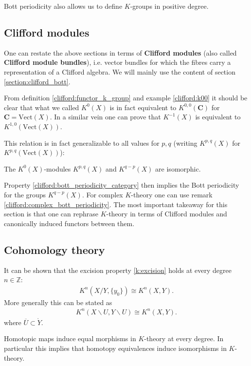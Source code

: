 {    \begin{remark}
        Bott periodicity also allows us to define $K$-groups in positive degree.
    \end{remark}

\subsection{Clifford modules}

    One can restate the above sections in terms of \textbf{Clifford modules} (also called \textbf{Clifford module bundles}), i.e. vector bundles for which the fibres carry a representation of a Clifford algebra. We will mainly use the content of section \ref{section:clifford_bott}.

    From definition \ref{clifford:functor_k_group} and example \ref{clifford:k00} it should be clear that what we called $K^0(X)$ is in fact equivalent to $K^{0,0}(\mathbf{C})$ for $\mathbf{C}=\text{Vect}(X)$. In a similar vein one can prove that $K^{-1}(X)$ is equivalent to $K^{1, 0}(\text{Vect}(X))$.

    This relation is in fact generalizable to all values for $p,q$ (writing $K^{p,q}(X)$ for $K^{p,q}(\text{Vect}(X))$):
    \begin{property}
        The $K^0(X)$-modules $K^{p,q}(X)$ and $K^{q-p}(X)$ are isomorphic.
    \end{property}

    Property \ref{clifford:bott_periodicity_category} then implies the Bott periodicity for the groups $K^{q-p}(X)$. For complex $K$-theory one can use remark \ref{clifford:complex_bott_periodicity}. The most important takeaway for this section is that one can rephrase $K$-theory in terms of Clifford modules and canonically induced functors between them.

\subsection{Cohomology theory}

    \begin{property}[Excision]
        It can be shown that the excision property \ref{k:excision} holds at every degree $n\in\mathbb{Z}$:
        \begin{gather}
            K^n(X/Y, \{y_0\})\cong K^n(X, Y).
        \end{gather}
        More generally this can be stated as
        \begin{gather}
            K^n(X\backslash U, Y\backslash U)\cong K^n(X, Y).
        \end{gather}
        where $\overline{U}\subset\mathring{Y}$.
    \end{property}
    \begin{property}
        Homotopic maps induce equal morphisms in $K$-theory at every degree. In particular this implies that homotopy equivalences induce isomorphisms in $K$-theory.
    \end{property}

}
